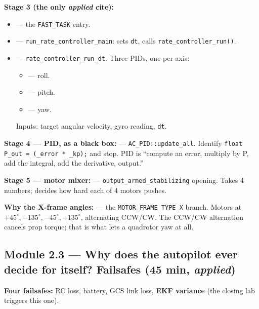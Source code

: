 \documentclass[a4paper,11pt,twoside]{article}
\begin{document}
\textbf{Stage 3 (the only \emph{applied} cite):}
\begin{itemize}
  \item {} --- the \texttt{FAST\_TASK} entry.
  \item {} --- \texttt{run\_rate\_controller\_main}: sets \texttt{dt}, calls \texttt{rate\_controller\_run()}.
  \item {} --- \texttt{rate\_controller\_run\_dt}. Three PIDs, one per axis:
  \begin{itemize}
    \item {} --- roll.
    \item {} --- pitch.
    \item {} --- yaw.
  \end{itemize}
  Inputs: target angular velocity, gyro reading, \texttt{dt}.
\end{itemize}

\textbf{Stage 4 --- PID, as a black box:}  --- \texttt{AC\_PID::update\_all}. Identify \texttt{float P\_out = (\_error * \_kp);} and stop. PID is ``compute an error, multiply by P, add the integral, add the derivative, output.''

\textbf{Stage 5 --- motor mixer:}  --- \texttt{output\_armed\_stabilizing} opening. Takes 4 numbers; decides how hard each of 4 motors pushes.

\textbf{Why the X-frame angles:}  --- the \texttt{MOTOR\_FRAME\_TYPE\_X} branch. Motors at $+45^\circ, -135^\circ, -45^\circ, +135^\circ$, alternating CCW/CW. The CCW/CW alternation cancels prop torque; that is what lets a quadrotor yaw at all.

\subsection{Module 2.3 --- Why does the autopilot ever decide for itself? Failsafes (45 min, \emph{applied})}

\textbf{Four failsafes:} RC loss, battery, GCS link loss, \textbf{EKF variance} (the closing lab triggers this one).
\end{document}
